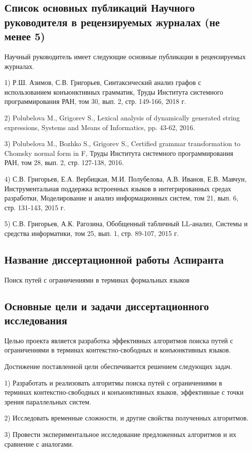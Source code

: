 \documentclass[12pt]{article}  %
\theoremstyle{remark}
\begin{document}
\subsection{Список основных публикаций Научного руководителя в рецензируемых журналах (не менее 5)}
Научный руководитель имеет следующие основные публикации в рецензируемых журналах.

1) Р.Ш. Азимов, С.В. Григорьев, Синтаксический анализ графов с использованием конъюнктивных грамматик, Труды Института системного программирования РАН, том 30, вып. 2, стр. 149-166, 2018 г.

2) Polubelova M., Grigorev S., Lexical analysis of dynamically generated string expressions, Systems and Means of Informatics, pp. 43-62, 2016.

3) Polubelova M., Bozhko S., Grigorev S., Certified grammar transformation to Chomsky normal form in F, Труды Института системного программирования РАН, том 28, вып. 2, стр. 127-138, 2016.

4) С.В. Григорьев, Е.А. Вербицкая, М.И. Полубелова, А.В. Иванов, Е.В. Мавчун, Инструментальная поддержка встроенных языков в интегрированных средах разработки, Моделирование и анализ информационных систем, том 21, вып. 6, стр. 131-143, 2015 г.

5) С.В. Григорьев, А.К. Рагозина, Обобщенный табличный LL-анализ, Системы и средства информатики, том 25, вып. 1, стр. 89-107, 2015 г.
\subsection{Название диссертационной работы Аспиранта}
Поиск путей с ограничениями в терминах формальных языков
\subsection{Основные цели и задачи диссертационного исследования}
Целью проекта является разработка эффективных алгоритмов поиска путей с ограничениями в терминах контекстно-свободных и конъюнктивных языков.

Достижение поставленной цели обеспечивается решением следующих задач.

1) Разработать и реализовать алгоритмы поиска путей с ограничениями в терминах контекстно-свободных и конъюнктивных языков, эффективные с точки зрения параллельных систем.

2) Исследовать временные сложности, и другие свойства полученных алгоритмов.

3) Провести экспериментальное исследование предложенных алгоритмов и их сравнение с аналогами.
\end{document}
